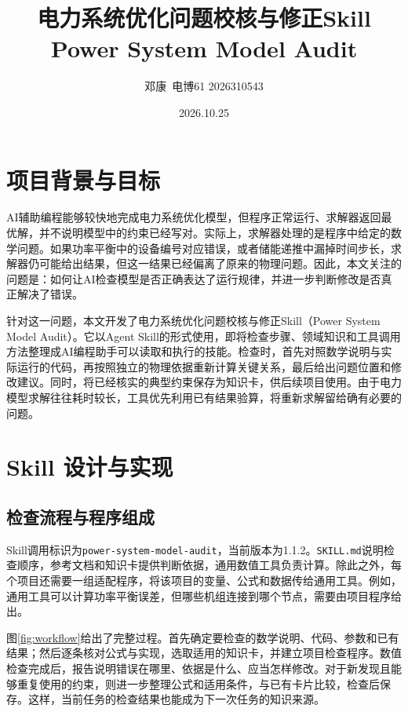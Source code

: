 \documentclass[chinese]{iarticle}
\author{邓康~电博61 2026310543}
\title{电力系统优化问题校核与修正Skill\\Power System Model Audit}
\date{2026.10.25}
\begin{document}
\maketitle

\section{项目背景与目标}

AI辅助编程能够较快地完成电力系统优化模型，但程序正常运行、求解器返回最优解，并不说明模型中的约束已经写对。实际上，求解器处理的是程序中给定的数学问题。如果功率平衡中的设备编号对应错误，或者储能递推中漏掉时间步长，求解器仍可能给出结果，但这一结果已经偏离了原来的物理问题。因此，本文关注的问题是：如何让AI检查模型是否正确表达了运行规律，并进一步判断修改是否真正解决了错误。

针对这一问题，本文开发了电力系统优化问题校核与修正Skill（Power System Model Audit）。它以Agent Skill的形式使用，即将检查步骤、领域知识和工具调用方法整理成AI编程助手可以读取和执行的技能。检查时，首先对照数学说明与实际运行的代码，再按照独立的物理依据重新计算关键关系，最后给出问题位置和修改建议。同时，将已经核实的典型约束保存为知识卡，供后续项目使用。由于电力模型求解往往耗时较长，工具优先利用已有结果验算，将重新求解留给确有必要的问题。

\section{Skill 设计与实现}

\subsection{检查流程与程序组成}

Skill调用标识为\texttt{power-system-model-audit}，当前版本为1.1.2。\texttt{SKILL.md}说明检查顺序，参考文档和知识卡提供判断依据，通用数值工具负责计算。除此之外，每个项目还需要一组适配程序，将该项目的变量、公式和数据传给通用工具。例如，通用工具可以计算功率平衡误差，但哪些机组连接到哪个节点，需要由项目程序给出\cite{skill}。

图\ref{fig:workflow}给出了完整过程。首先确定要检查的数学说明、代码、参数和已有结果；然后逐条核对公式与实现，选取适用的知识卡，并建立项目检查程序。数值检查完成后，报告说明错误在哪里、依据是什么、应当怎样修改。对于新发现且能够重复使用的约束，则进一步整理公式和适用条件，与已有卡片比较，检查后保存。这样，当前任务的检查结果也能成为下一次任务的知识来源。
\end{document}
